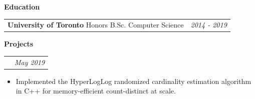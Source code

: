 \documentclass[letterpaper,10pt]{article}
\makeatletter
\newcommand{\resitem}[1]{\item #1 \vspace{0pt}}
\newcommand{\resheading}[1]{{\textbf{\Large{#1} \vphantom{p\^{E}}}\vspace{7pt}}}
\newcommand{\ressubheading}[4]{
\begin{tabular*}{7in}{l@{\extracolsep{\fill}}r}
		\textbf{#1} #2 & \textit{#4} \\
\end{tabular*}\vspace{0pt}}
\newcommand{\resprojectsubheading}[2]{
\begin{tabular*}{7in}{l@{\extracolsep{\fill}}r}
        \textbf{#1} & \textit{#2} \\
\end{tabular*}\vspace{0pt}}
\newcommand{\MYhref}[3][blue]{\href{#2}{\color{#1}{\underline{#3}}}}%
\makeatother
\begin{document}




\resheading{Education}
\ressubheading{University of Toronto}{Honors B.Sc. Computer Science}{}{2014 - 2019}









\resheading{Projects}
	



   \resprojectsubheading{\textbf{\MYhref{https://sooham.github.io/2019/05/28/Counting-efficiently-at-scale-using-HyperLogLog/}{HyperLogLog Cardinality Estimator}}}{May 2019}
	\begin{itemize} \vspace{-\topsep}
    \setlength{\parskip}{0pt}
    \setlength{\itemsep}{0pt plus 1pt}
    \resitem{Implemented the HyperLogLog randomized cardinality estimation algorithm in C++ for memory-efficient count-distinct at scale.}
    \end{itemize}
\end{document}
